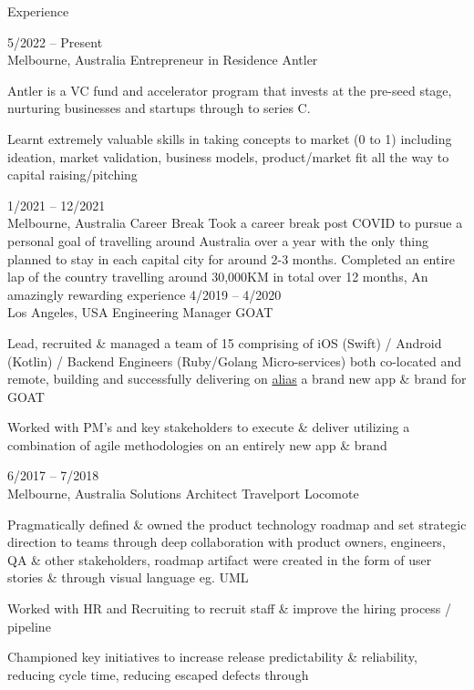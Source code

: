 \documentclass[9pt]{developercv} %
\begin{document}
\begin{cvsect}{Experience}

  \begin{entrylist}
    \entry
      {5/2022 -- Present\\\footnotesize{Melbourne, Australia}}
      {Entrepreneur in Residence}
      {Antler}
      {Antler is a VC fund and accelerator program that invests at the pre-seed stage, nurturing businesses and startups through to series C.
    \par\medskip Learnt extremely valuable skills in taking concepts to market (0 to 1) including ideation, market validation, business models, product/market fit all the way to capital raising/pitching
      }
    \entry
      {1/2021 -- 12/2021\\\footnotesize{Melbourne, Australia}}
      {Career Break}
      {}
      {Took a career break post COVID to pursue a personal goal of travelling around Australia over a year with the only thing planned to stay in each capital city for around 2-3 months. Completed an entire lap of the country travelling around 30,000KM in total over 12 months, An amazingly rewarding experience}
    \entry
      {4/2019 -- 4/2020\\\footnotesize{Los Angeles, USA}}
      {Engineering Manager}
      {GOAT}
      {Lead, recruited \& managed a team of 15 comprising of iOS (Swift) / Android
      (Kotlin) / Backend Engineers (Ruby/Golang Micro-services)  both co-located
      and remote, building and successfully delivering on \href{https://apps.apple.com/us/app/id1467090341}{alias} a brand new app \& brand for GOAT
      \par\medskip Worked with PM’s and key stakeholders to execute \& deliver utilizing a
      combination of agile methodologies on an entirely new app \& brand}
    \entry
      {6/2017 -- 7/2018\\\footnotesize{Melbourne, Australia}}
      {Solutions Architect}
      {Travelport Locomote}
      {
      Pragmatically defined \& owned the product technology roadmap and set
      strategic direction to teams through deep collaboration with product owners,
      engineers, QA \& other stakeholders, roadmap artifact were created in the form of user stories \& through visual language eg. UML
      \par\medskip Worked with HR and Recruiting to recruit staff \& improve the hiring process / pipeline
      \par\medskip Championed key initiatives to increase release predictability \& reliability, reducing cycle time, reducing escaped defects through
}
\end{entrylist}
\end{cvsect}
\end{document}
